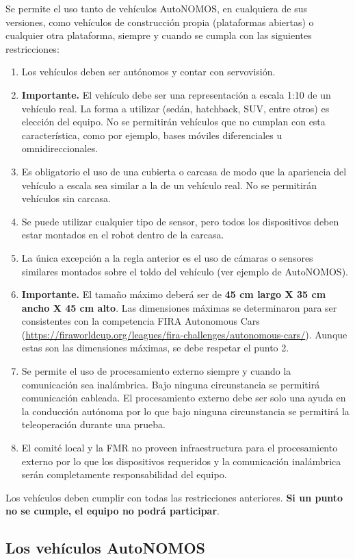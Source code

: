 \documentclass[letterpaper,12pt]{article}
\begin{document}
Se permite el uso tanto de vehículos AutoNOMOS, en cualquiera de sus versiones, como vehículos de construcción propia (plataformas abiertas) o cualquier otra plataforma, siempre y cuando se cumpla con las siguientes restricciones:
\begin{enumerate}
\item Los vehículos deben ser autónomos y contar con servovisión.
\item \textbf{Importante. } El vehículo debe ser una representación a escala 1:10 de un vehículo real. La forma a utilizar (sedán, hatchback, SUV, entre otros) es elección del equipo. No se permitirán vehículos que no cumplan con esta característica, como por ejemplo, bases móviles diferenciales u omnidireccionales.
\item Es obligatorio el uso de una cubierta o carcasa de modo que la apariencia del vehículo a escala sea similar a la de un vehículo real. No se permitirán vehículos sin carcasa.
\item Se puede utilizar cualquier tipo de sensor, pero todos los dispositivos deben estar montados en el robot dentro de la carcasa.
\item La única excepción a la regla anterior es el uso de cámaras o sensores similares montados sobre el toldo del vehículo (ver ejemplo de AutoNOMOS).
\item \textbf{Importante.} El tamaño máximo deberá ser de \textbf{45 cm largo X 35 cm ancho X 45 cm alto}. Las dimensiones máximas se determinaron para ser consistentes con la competencia FIRA Autonomous Cars (\url{https://firaworldcup.org/leagues/fira-challenges/autonomous-cars/}). Aunque estas son las dimensiones máximas, se debe respetar el punto 2. 
\item Se permite el uso de procesamiento externo siempre y cuando la comunicación sea inalámbrica. Bajo ninguna circunstancia se permitirá comunicación cableada. El procesamiento externo debe ser solo una ayuda en la conducción autónoma por lo que bajo ninguna circunstancia se permitirá la teleoperación durante una prueba.
\item El comité local y la FMR no proveen infraestructura para el procesamiento externo por lo que los dispositivos requeridos y la comunicación inalámbrica serán completamente responsabilidad del equipo.
\end{enumerate}
Los vehículos deben cumplir con todas las restricciones anteriores. \textbf{Si un punto no se cumple, el equipo no podrá participar}.

\subsection{Los vehículos AutoNOMOS}
\end{document}
